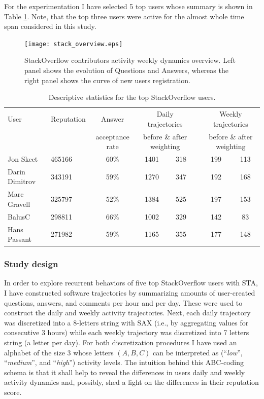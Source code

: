 For the experimentation I have selected 5 top users whose summary is shown in Table \ref{so_table}. Note, that the top three users were active for the almost whole time span considered in this study.

\begin{figure}
\centering
\texttt{[image: stack\_overview.eps]}
\caption[StackOverflow contributors activity dynamics overview.]{StackOverflow contributors activity weekly dynamics overview. Left panel shows the evolution of Questions and Answers, whereas the right panel shows the curve of new users registration.}
\label{fig:stack_dynamics}   
\end{figure}

\begin{table}[]
\begin{small}
\begin{tabularx}{\linewidth}{l X c c c c c c}
\toprule
User   & Reputation   &   Answer & \multicolumn{2}{c}{Daily  trajectories} & & \multicolumn{2}{c}{Weekly trajectories}\\
& & acceptance rate & \multicolumn{2}{c}{before \& after weighting} & & \multicolumn{2}{c}{before \& after weighting}\\
\midrule
Jon Skeet   & 465166 & 60\% &1401 & 318 & \qquad & 199 & 113 \\
Darin Dimitrov   &  343191 & 59\% & 1270  & 347 & &192 & 168\\
Marc Gravell & 325797 & 52\%  &1384 &525 & &197 & 153 \\
BalusC  & 298811 & 66\% &1002 &329 & &142 & 83 \\
Hans Passant & 271982 & 59\% &1165    &355 & &177 & 148\\
\bottomrule
\end{tabularx}
\caption{Descriptive statistics for the top StackOverflow users.}
\label{so_table}
\end{small}
\end{table}

\subsubsection{Study design}
In order to explore recurrent behaviors of five top StackOverflow users with STA, I have constructed software trajectories by summarizing amounts of user-created questions, answers, and comments per hour and per day. These were used to construct the daily and weekly activity trajectories. Next, each daily trajectory was discretized into a 8-letters string with SAX (i.e., by aggregating values for consecutive 3 hours) while each weekly trajectory was discretized into 7 letters string (a letter per day). For both discretization procedures I have used an alphabet of the size 3 whose letters $(A,B,C)$ can be interpreted as (``\textit{low}'', ``\textit{medium}'', and ``\textit{high}'') activity levels. The intuition behind this ABC-coding schema is that it shall help to reveal the differences in users daily and weekly activity dynamics and, possibly, shed a light on the differences in their reputation score.

